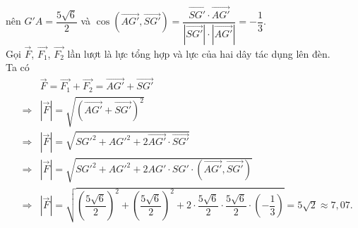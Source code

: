 \begin{ex}
{\begin{eqnarray*}
			\end{eqnarray*} 
		nên $G'A=\dfrac{5\sqrt{6}}{2}$ và $\cos\left(\overrightarrow{AG'}, \overrightarrow{SG'}\right)=\dfrac{\overrightarrow{SG'}\cdot\overrightarrow{AG'}}{\left|\overrightarrow{SG'}\right|\cdot\left|\overrightarrow{AG'}\right|}=-\dfrac{1}{3}.$\\
		Gọi $\overrightarrow{F}$, $\overrightarrow{F_1}$, $\overrightarrow{F_2}$ lần lượt là lực tổng hợp và lực của hai dây tác dụng lên đèn.\\
		Ta có 
		\begin{eqnarray*}
	&&\overrightarrow{F}=\overrightarrow{F_1}+\overrightarrow{F_2}=\overrightarrow{AG'}+\overrightarrow{SG'}\\
	& \Rightarrow& \left|\overrightarrow{F}\right|=\sqrt{\left(\overrightarrow{AG'}+\overrightarrow{SG'}\right)^2}\\
	& \Rightarrow & \left|\overrightarrow{F}\right|=\sqrt{SG'^2+AG'^2+2\overrightarrow{AG'}\cdot\overrightarrow{SG'}}\\
	& \Rightarrow &\left|\overrightarrow{F}\right|=\sqrt{SG'^2+AG'^2+2AG'\cdot SG'\cdot\left(\overrightarrow{AG'},\overrightarrow{SG'}\right)}\\
	& \Rightarrow &\left|\overrightarrow{F}\right|=\sqrt{\left(\dfrac{5\sqrt{6}}{2}\right)^2+\left(\dfrac{5\sqrt{6}}{2}\right)^2+2\cdot \dfrac{5\sqrt{6}}{2}\cdot \dfrac{5\sqrt{6}}{2}\cdot\left(-\dfrac{1}{3}\right)}=5\sqrt{2} \approx 7{,}07.
%			
		\end{eqnarray*}
		}
\end{ex}

